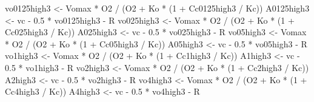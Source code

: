 \documentclass[
]{krantz}
\makeatletter
\newenvironment{Shaded}{\begin{snugshade}}{\end{snugshade}}
\newcommand{\DecValTok}[1]{\textcolor[rgb]{0.00,0.00,0.81}{#1}}
\newcommand{\FloatTok}[1]{\textcolor[rgb]{0.00,0.00,0.81}{#1}}
\newcommand{\NormalTok}[1]{#1}
\newcommand{\OtherTok}[1]{\textcolor[rgb]{0.56,0.35,0.01}{#1}}
\newcommand{\SpecialCharTok}[1]{\textcolor[rgb]{0.00,0.00,0.00}{#1}}
\newenvironment{kframe}{%
\medskip{}
\setlength{\fboxsep}{.8em}
 \def\at@end@of@kframe{}%
 \ifinner\ifhmode%
  \def\at@end@of@kframe{\end{minipage}}%
  \begin{minipage}{\columnwidth}%
 \fi\fi%
 \def\FrameCommand##1{\hskip\@totalleftmargin \hskip-\fboxsep
 \colorbox{shadecolor}{##1}\hskip-\fboxsep
     \hskip-\linewidth \hskip-\@totalleftmargin \hskip\columnwidth}%
 \MakeFramed {\advance\hsize-\width
   \@totalleftmargin\z@ \linewidth\hsize
   \@setminipage}}%
 {\par\unskip\endMakeFramed%
 \at@end@of@kframe}
\renewenvironment{Shaded}{\begin{kframe}}{\end{kframe}}
\makeatother
\begin{document}
\begin{Shaded}
\begin{Highlighting}[]
\NormalTok{vo0125high3 }\OtherTok{\textless{}{-}}\NormalTok{ Vomax }\SpecialCharTok{*}\NormalTok{ O2 }\SpecialCharTok{/}\NormalTok{ (O2 }\SpecialCharTok{+}\NormalTok{ Ko }\SpecialCharTok{*}\NormalTok{ (}\DecValTok{1} \SpecialCharTok{+}\NormalTok{ Cc0125high3 }\SpecialCharTok{/}\NormalTok{ Kc)) }
\NormalTok{A0125high3 }\OtherTok{\textless{}{-}}\NormalTok{ vc }\SpecialCharTok{{-}} \FloatTok{0.5} \SpecialCharTok{*}\NormalTok{ vo0125high3 }\SpecialCharTok{{-}}\NormalTok{ R }
\NormalTok{vo025high3 }\OtherTok{\textless{}{-}}\NormalTok{ Vomax }\SpecialCharTok{*}\NormalTok{ O2 }\SpecialCharTok{/}\NormalTok{ (O2 }\SpecialCharTok{+}\NormalTok{ Ko }\SpecialCharTok{*}\NormalTok{ (}\DecValTok{1} \SpecialCharTok{+}\NormalTok{ Cc025high3 }\SpecialCharTok{/}\NormalTok{ Kc)) }
\NormalTok{A025high3 }\OtherTok{\textless{}{-}}\NormalTok{ vc }\SpecialCharTok{{-}} \FloatTok{0.5} \SpecialCharTok{*}\NormalTok{ vo025high3 }\SpecialCharTok{{-}}\NormalTok{ R }
\NormalTok{vo05high3 }\OtherTok{\textless{}{-}}\NormalTok{ Vomax }\SpecialCharTok{*}\NormalTok{ O2 }\SpecialCharTok{/}\NormalTok{ (O2 }\SpecialCharTok{+}\NormalTok{ Ko }\SpecialCharTok{*}\NormalTok{ (}\DecValTok{1} \SpecialCharTok{+}\NormalTok{ Cc05high3 }\SpecialCharTok{/}\NormalTok{ Kc)) }
\NormalTok{A05high3 }\OtherTok{\textless{}{-}}\NormalTok{ vc }\SpecialCharTok{{-}} \FloatTok{0.5} \SpecialCharTok{*}\NormalTok{ vo05high3 }\SpecialCharTok{{-}}\NormalTok{ R }
\NormalTok{vo1high3 }\OtherTok{\textless{}{-}}\NormalTok{ Vomax }\SpecialCharTok{*}\NormalTok{ O2 }\SpecialCharTok{/}\NormalTok{ (O2 }\SpecialCharTok{+}\NormalTok{ Ko }\SpecialCharTok{*}\NormalTok{ (}\DecValTok{1} \SpecialCharTok{+}\NormalTok{ Cc1high3 }\SpecialCharTok{/}\NormalTok{ Kc)) }
\NormalTok{A1high3 }\OtherTok{\textless{}{-}}\NormalTok{ vc }\SpecialCharTok{{-}} \FloatTok{0.5} \SpecialCharTok{*}\NormalTok{ vo1high3 }\SpecialCharTok{{-}}\NormalTok{ R }
\NormalTok{vo2high3 }\OtherTok{\textless{}{-}}\NormalTok{ Vomax }\SpecialCharTok{*}\NormalTok{ O2 }\SpecialCharTok{/}\NormalTok{ (O2 }\SpecialCharTok{+}\NormalTok{ Ko }\SpecialCharTok{*}\NormalTok{ (}\DecValTok{1} \SpecialCharTok{+}\NormalTok{ Cc2high3 }\SpecialCharTok{/}\NormalTok{ Kc)) }
\NormalTok{A2high3 }\OtherTok{\textless{}{-}}\NormalTok{ vc }\SpecialCharTok{{-}} \FloatTok{0.5} \SpecialCharTok{*}\NormalTok{ vo2high3 }\SpecialCharTok{{-}}\NormalTok{ R }
\NormalTok{vo4high3 }\OtherTok{\textless{}{-}}\NormalTok{ Vomax }\SpecialCharTok{*}\NormalTok{ O2 }\SpecialCharTok{/}\NormalTok{ (O2 }\SpecialCharTok{+}\NormalTok{ Ko }\SpecialCharTok{*}\NormalTok{ (}\DecValTok{1} \SpecialCharTok{+}\NormalTok{ Cc4high3 }\SpecialCharTok{/}\NormalTok{ Kc)) }
\NormalTok{A4high3 }\OtherTok{\textless{}{-}}\NormalTok{ vc }\SpecialCharTok{{-}} \FloatTok{0.5} \SpecialCharTok{*}\NormalTok{ vo4high3 }\SpecialCharTok{{-}}\NormalTok{ R }


\end{Highlighting}
\end{Shaded}
\end{document}
